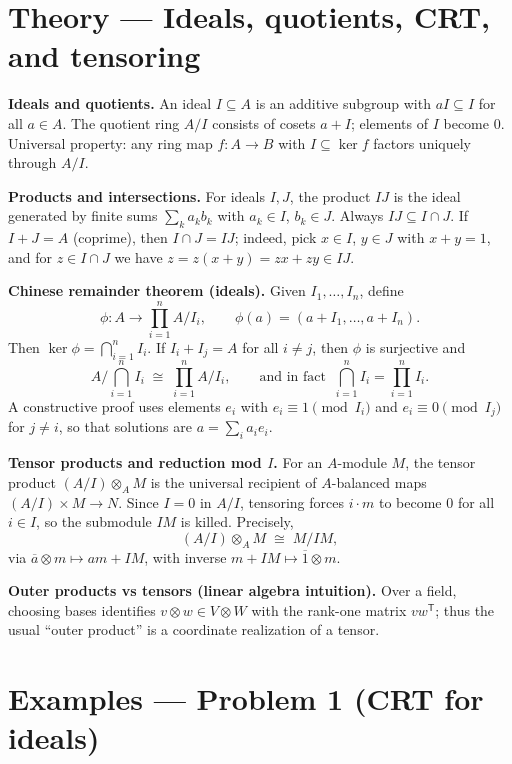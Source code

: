 \documentclass[12pt,a4paper]{article}
\theoremstyle{plain}
\theoremstyle{definition}      %
\begin{document}
	
	\section*{Theory — Ideals, quotients, CRT, and tensoring}
	
	\textbf{Ideals and quotients.}
	An ideal \(I\subseteq A\) is an additive subgroup with \(aI\subseteq I\) for all \(a\in A\).
	The quotient ring \(A/I\) consists of cosets \(a+I\); elements of \(I\) become \(0\).
	Universal property: any ring map \(f:A\to B\) with \(I\subseteq \ker f\) factors uniquely through \(A/I\).
	
	\medskip
	\textbf{Products and intersections.}
	For ideals \(I,J\), the product \(IJ\) is the ideal generated by finite sums \(\sum_k a_k b_k\) with
	\(a_k\in I\), \(b_k\in J\). Always \(IJ\subseteq I\cap J\).
	If \(I+J=A\) (coprime), then \(I\cap J=IJ\); indeed, pick \(x\in I\), \(y\in J\) with \(x+y=1\), and for
	\(z\in I\cap J\) we have \(z=z(x+y)=zx+zy\in IJ\).
	
	\medskip
	\textbf{Chinese remainder theorem (ideals).}
	Given \(I_1,\dots,I_n\), define
	\[
	\phi:A\to \prod_{i=1}^n A/I_i,\qquad \phi(a)=(a+I_1,\dots,a+I_n).
	\]
	Then \(\ker\phi=\bigcap_{i=1}^n I_i\). If \(I_i+I_j=A\) for all \(i\neq j\), then \(\phi\) is surjective and
	\[
	A/\bigcap_{i=1}^n I_i \;\cong\; \prod_{i=1}^n A/I_i,
	\qquad
	\text{and in fact }\ \bigcap_{i=1}^n I_i=\prod_{i=1}^n I_i.
	\]
	A constructive proof uses elements \(e_i\) with \(e_i\equiv 1\pmod{I_i}\) and \(e_i\equiv 0\pmod{I_j}\) for \(j\neq i\),
	so that solutions are \(a=\sum_i a_i e_i\).
	
	\medskip
	\textbf{Tensor products and reduction mod \(I\).}
	For an \(A\)-module \(M\), the tensor product \((A/I)\otimes_A M\) is the universal recipient of \(A\)-balanced maps
	\((A/I)\times M\to N\). Since \(I=0\) in \(A/I\), tensoring forces \(i\cdot m\) to become \(0\) for all \(i\in I\),
	so the submodule \(IM\) is killed. Precisely,
	\[
	(A/I)\otimes_A M \;\cong\; M/IM,
	\]
	via \(\overline{a}\otimes m\mapsto am+IM\), with inverse \(m+IM\mapsto \overline{1}\otimes m\).
	
	\medskip
	\textbf{Outer products vs tensors (linear algebra intuition).}
	Over a field, choosing bases identifies \(v\otimes w\in V\otimes W\) with the rank-one matrix \(vw^{\mathsf T}\);
	thus the usual ``outer product'' is a coordinate realization of a tensor.
	
	
	\section*{Examples — Problem 1 (CRT for ideals)}
	
\end{document}
